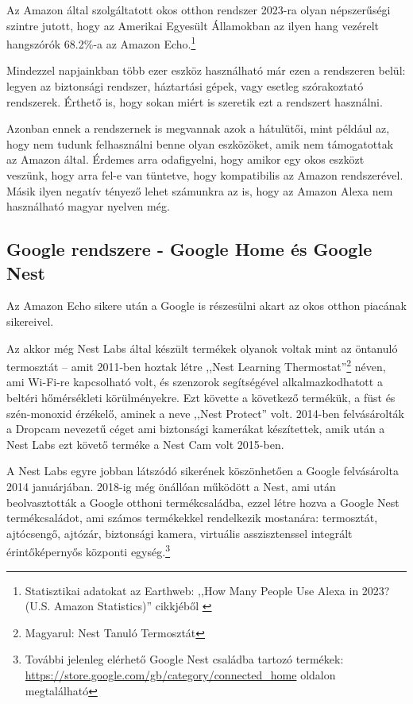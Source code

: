 \documentclass[
]{thesis-ekf}
\theoremstyle{definition}
\theoremstyle{remark}
\begin{document}
	Az Amazon által szolgáltatott okos otthon rendszer 2023-ra olyan népszerűségi szintre jutott, hogy az Amerikai Egyesült Államokban az ilyen hang vezérelt hangszórók 68.2\%-a az Amazon Echo.\footnote{Statisztikai adatokat az Earthweb: ,,How Many People Use Alexa in 2023? (U.S. Amazon Statistics)'' cikkjéből \cite{amazon-stats}} 
	
	Mindezzel napjainkban több ezer eszköz használható már ezen a rendszeren belül: legyen az biztonsági rendszer, háztartási gépek, vagy esetleg szórakoztató rendszerek. Érthető is, hogy sokan miért is szeretik ezt a rendszert használni.
	
	Azonban ennek a rendszernek is megvannak azok a hátulütői, mint például az, hogy nem tudunk felhasználni benne olyan eszközöket, amik nem támogatottak az Amazon által. Érdemes arra odafigyelni, hogy amikor egy okos eszközt veszünk, hogy arra fel-e van tüntetve, hogy kompatibilis az Amazon rendszerével. Másik ilyen negatív tényező lehet számunkra az is, hogy az Amazon Alexa nem használható magyar nyelven még.
	
	\subsection{Google rendszere - Google Home és Google Nest}
	Az Amazon Echo sikere után a Google is részesülni akart az okos otthon piacának sikereivel. 
	
	Az akkor még Nest Labs által készült termékek olyanok voltak mint az öntanuló termosztát -- amit 2011-ben hoztak létre ,,Nest Learning Thermostat''\footnote{Magyarul: Nest Tanuló Termosztát} néven, ami Wi-Fi-re kapcsolható volt, és szenzorok segítségével alkalmazkodhatott a beltéri hőmérsékleti körülményekre. Ezt követte a következő termékük, a füst és szén-monoxid érzékelő, aminek a neve ,,Nest Protect'' volt. 2014-ben felvásárolták a Dropcam nevezetű céget ami biztonsági kamerákat készítettek, amik után a Nest Labs ezt követő terméke a Nest Cam volt 2015-ben.
	
	A Nest Labs egyre jobban látszódó sikerének köszönhetően a Google felvásárolta 2014 januárjában. 2018-ig még önállóan működött a Nest, ami után beolvasztották a Google otthoni termékcsaládba, ezzel létre hozva a Google Nest termékcsaládot, ami számos termékekkel rendelkezik mostanára: termosztát, ajtócsengő, ajtózár, biztonsági kamera, virtuális asszisztenssel integrált érintőképernyős központi egység.\footnote{\label{google-store} További jelenleg elérhető Google Nest családba tartozó termékek: \url{https://store.google.com/gb/category/connected_home} oldalon megtalálható}
	
\end{document}
